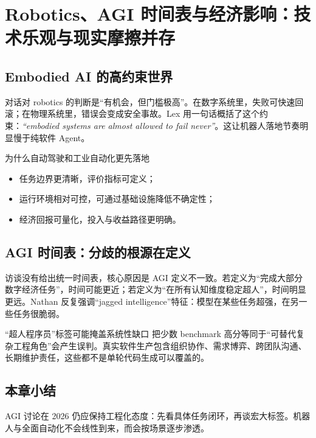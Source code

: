 \section{Robotics、AGI 时间表与经济影响：技术乐观与现实摩擦并存}

\subsection{Embodied AI 的高约束世界}

对话对 robotics 的判断是“有机会，但门槛极高”。在数字系统里，失败可快速回滚；在物理系统里，错误会变成安全事故。Lex 用一句话概括了这个约束：\textit{``embodied systems are almost allowed to fail never''}。这让机器人落地节奏明显慢于纯软件 Agent。

\begin{importantbox}{为什么自动驾驶和工业自动化更先落地}
\begin{itemize}[leftmargin=1.5em]
    \item 任务边界更清晰，评价指标可定义；
    \item 运行环境相对可控，可通过基础设施降低不确定性；
    \item 经济回报可量化，投入与收益路径更明确。
\end{itemize}
\end{importantbox}

\subsection{AGI 时间表：分歧的根源在定义}

访谈没有给出统一时间表，核心原因是 AGI 定义不一致。若定义为“完成大部分数字经济任务”，时间可能更近；若定义为“在所有认知维度稳定超人”，时间明显更远。Nathan 反复强调“jagged intelligence”特征：模型在某些任务超强，在另一些任务很脆弱。

\begin{warningbox}{“超人程序员”标签可能掩盖系统性缺口}
把少数 benchmark 高分等同于“可替代复杂工程角色”会产生误判。真实软件生产包含组织协作、需求博弈、跨团队沟通、长期维护责任，这些都不是单轮代码生成可以覆盖的。
\end{warningbox}

\subsection{本章小结}

AGI 讨论在 2026 仍应保持工程化态度：先看具体任务闭环，再谈宏大标签。机器人与全面自动化不会线性到来，而会按场景逐步渗透。

